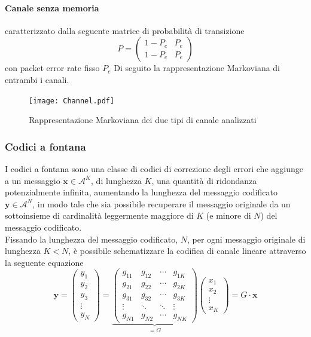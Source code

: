 \documentclass[italian, a4paper, 12pt]{article}
\begin{document}
\paragraph{Canale senza memoria} caratterizzato dalla seguente matrice di probabilità di transizione
$$P=\begin{pmatrix}
1-P_e & P_e \\
1-P_e & P_e
\end{pmatrix}$$
con packet error rate fisso $P_e$
Di seguito la rappresentazione Markoviana di entrambi i canali.
\begin{figure}[H]
    \centering
        \texttt{[image: Channel.pdf]}
    \caption{Rappresentazione Markoviana dei due tipi di canale analizzati}
    \label{fig:Channel}
\end{figure}
\subsubsection{Codici a fontana}\label{FCsection}
I codici a fontana sono una classe di codici di correzione degli errori che aggiunge a un messaggio $\bm{x}\in\mathcal{A}^K$, di lunghezza $K$, una quantità di ridondanza potenzialmente infinita, aumentando la lunghezza del messaggio codificato $\bm{y}\in\mathcal{A}^N$, in modo tale che sia possibile recuperare il messaggio originale da un sottoinsieme di cardinalità leggermente maggiore di $K$ (e minore di $N$) del messaggio codificato.\\
Fissando la lunghezza del messaggio codificato, $N$, per ogni messaggio originale di lunghezza $K<N$, è possibile schematizzare la codifica di canale lineare attraverso la seguente equazione
\begin{equation}
\bm{y} =
\begin{pmatrix}
y_1 \\y_2 \\y_3 \\\vdots \\y_N
\end{pmatrix} = \underbrace{\begin{pmatrix}
g_{11}	&g_{12}	&\cdots	&g_{1K}\\
g_{21}	&g_{22}	&\cdots	&g_{2K}\\
g_{31}	&g_{32}	&\cdots	&g_{3K}\\
\vdots &\ddots & \ddots &\vdots\\
g_{N1}	&g_{N2}	&\cdots	&g_{NK}
\end{pmatrix}}_{=G} \begin{pmatrix}
x_1 \\x_2 \\\vdots \\x_K
\end{pmatrix} = G \cdot \bm{x}
\end{equation}
\end{document}

